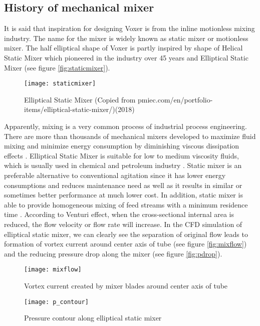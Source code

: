 \subsection{History of mechanical mixer}
It is said that inspiration for designing Voxer is from the inline motionless mixing industry. The name for the mixer is widely known as static mixer or motionless mixer. The half elliptical shape of Voxer is partly inspired by shape of Helical Static Mixer which pioneered in the industry over 45 years \cite{stamixco:web} and Elliptical Static Mixer (see figure \vref{fig:staticmixer}).  
\begin{figure}[h]
  \centering
  \texttt{[image: staticmixer]}
  \caption{ Elliptical Static Mixer (Copied from pmiec.com/en/portfolio-items/elliptical-static-mixer/)(2018) \cite{static:web}}
  \label{fig:staticmixer}
\end{figure}
Apparently, mixing is a very common process of industrial process engineering. There are more than thousands of mechanical mixers developed to maximize fluid mixing and minimize energy consumption by diminishing viscous dissipation effects \cite{mixing:article}. Elliptical Static Mixer is suitable for low to medium viscosity fluids, which is usually used in chemical and petroleum industry \cite{static:web}. 
Static mixer is an preferable alternative to conventional agitation since it has lower energy consumptions and reduces maintenance need as well as it results in similar or sometimes better performance at much lower cost. In addition, static mixer is able to provide homogeneous mixing of feed streams with a minimum residence time \cite{thakur:article}. According to Venturi effect, when the cross-sectional internal area is reduced, the flow velocity or flow rate will increase. 
In the CFD simulation of elliptical static mixer, we can clearly see the separation of original flow leads to formation of vortex current around center axis of tube (see figure \vref{fig:mixflow}) and the reducing pressure drop along the mixer (see figure \vref{fig:pdrop}).
\begin{figure}[h]
  \centering
  \texttt{[image: mixflow]}
  \caption{ Vortex current created by mixer blades around center axis of tube\cite{cfd:article}}
  \label{fig:mixflow}
\end{figure}
\begin{figure}[h]
  \centering
  \texttt{[image: p\_contour]}
  \caption{ Pressure contour along elliptical static mixer\cite{cfd:article}}
  \label{fig:pdrop}
\end{figure}

